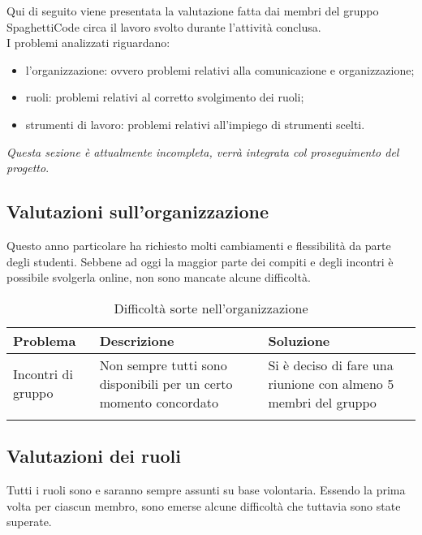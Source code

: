 \documentclass[../piano_di_qualifica.tex]{subfiles}
\begin{document}
Qui di seguito viene presentata la valutazione fatta dai membri del gruppo SpaghettiCode circa il lavoro svolto durante l'attività conclusa.\\
I problemi analizzati riguardano:
\begin{itemize}
	\item l'organizzazione: ovvero problemi relativi alla comunicazione e organizzazione;
	\item ruoli: problemi relativi al corretto svolgimento dei ruoli;
	\item strumenti di lavoro: problemi relativi all'impiego di strumenti scelti.
\end{itemize}
\emph{Questa sezione è attualmente incompleta, verrà integrata col proseguimento del progetto}.

\subsection{Valutazioni sull'organizzazione}
\label{sub:valut_org}
Questo anno particolare ha richiesto molti cambiamenti e flessibilità da parte degli studenti. Sebbene ad oggi la maggior parte dei compiti e
degli incontri è possibile svolgerla online, non sono mancate alcune difficoltà.

\begin{center}
	\begin{longtable}{|l|p{6cm}|p{6cm}|}
		\hline
		\rowcolor{lightgray}
		{\textbf{Problema}} & {\textbf{Descrizione}} & {\textbf{Soluzione}} \\
		\hline
		Incontri di gruppo & Non sempre tutti sono disponibili per un certo momento concordato &
		Si è deciso di fare una riunione con almeno 5 membri del gruppo \\
		\hline
		\rowcolor{white}
		\caption{Difficoltà sorte nell'organizzazione}
	\end{longtable}
\end{center}

\subsection{Valutazioni dei ruoli}
\label{sub:valut_ruoli}
Tutti i ruoli sono e saranno sempre assunti su base volontaria. Essendo la prima volta per ciascun membro, sono emerse alcune difficoltà che tuttavia sono state superate.\par
\end{document}
